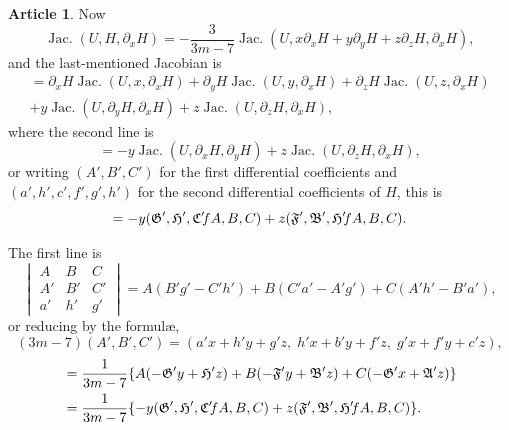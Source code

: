 \documentclass[12pt,a4paper]{article}
\theoremstyle{definition}
\newtheorem{art}{Article}[section]
\DeclareMathOperator{\Jac}{Jac.}
\begin{document}
\begin{art}
Now
\[
\Jac(U, H, \partial_x H) = -\frac{3}{3m - 7}\Jac(U, x\partial_x H + y\partial_y H + z\partial_z H, \partial_x H),
\]
and the last-mentioned Jacobian is
\begin{multline*}
= \partial_x H\Jac(U, x, \partial_x H) + \partial_y H\Jac(U, y, \partial_x H) + \partial_z H\Jac(U, z, \partial_x H) \\
+ y\Jac(U, \partial_y H, \partial_x H) + z\Jac(U, \partial_z H, \partial_x H),
\end{multline*}
where the second line is
\[
= -y\Jac(U, \partial_x H, \partial_y H) + z\Jac(U, \partial_z H, \partial_x H),
\]
or writing $(A', B', C')$ for the first differential coefficients and $(a', h', c', f', g', h')$ for the second differential coefficients of $H$, this is
\[
= -y(\mathfrak{G}', \mathfrak{H}', \mathfrak{C}' \hspace{-2pt} fA, B, C) + z(\mathfrak{F}', \mathfrak{B}', \mathfrak{H}' \hspace{-2pt} fA, B, C).
\]

The first line is
\[
\begin{vmatrix} A & B & C \\ A' & B' & C' \\ a' & h' & g' \end{vmatrix}
= A(B'g' - C'h') + B(C'a' - A'g') + C(A'h' - B'a'),
\]
or reducing by the formul\ae,
\[
(3m - 7)(A', B', C') = (a'x + h'y + g'z, \; h'x + b'y + f'z, \; g'x + f'y + c'z),
\]
\begin{align*}
&= \frac{1}{3m - 7}\{A(-\mathfrak{G}'y + \mathfrak{H}'z) + B(-\mathfrak{F}'y + \mathfrak{B}'z) + C(-\mathfrak{G}'x + \mathfrak{A}'z)\} \\
&= \frac{1}{3m - 7}\{-y(\mathfrak{G}', \mathfrak{H}', \mathfrak{C}' \hspace{-2pt} fA, B, C) + z(\mathfrak{F}', \mathfrak{B}', \mathfrak{H}' \hspace{-2pt} fA, B, C)\}.
\end{align*}


\end{art}
\end{document}

